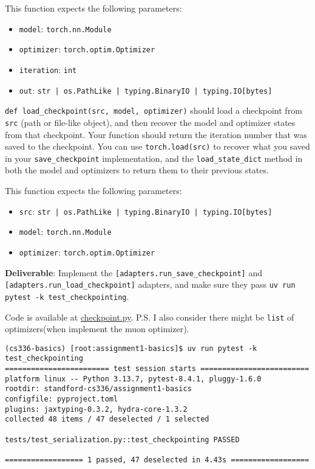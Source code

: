 This function expects the following parameters:
\begin{itemize}
    \item \texttt{model}: \texttt{torch.nn.Module}
    \item \texttt{optimizer}: \texttt{torch.optim.Optimizer}
    \item \texttt{iteration}: \texttt{int}
    \item \texttt{out}: \texttt{str | os.PathLike | typing.BinaryIO | typing.IO[bytes]}
\end{itemize}

\texttt{def load\_checkpoint(src, model, optimizer)} should load a checkpoint from \texttt{src} (path or file-like object), and then recover the model and optimizer states from that checkpoint. Your function should return the iteration number that was saved to the checkpoint. You can use \texttt{torch.load(src)} to recover what you saved in your \texttt{save\_checkpoint} implementation, and the \texttt{load\_state\_dict} method in both the model and optimizers to return them to their previous states.

This function expects the following parameters:
\begin{itemize}
    \item \texttt{src}: \texttt{str | os.PathLike | typing.BinaryIO | typing.IO[bytes]}
    \item \texttt{model}: \texttt{torch.nn.Module}
    \item \texttt{optimizer}: \texttt{torch.optim.Optimizer}
\end{itemize}

\textbf{Deliverable}: Implement the \lstinline{[adapters.run_save_checkpoint]} and \lstinline{[adapters.run_load_checkpoint]} adapters, and make sure they pass \lstinline{uv run pytest -k test_checkpointing}.

\begin{answer}
Code is available at \href{https://github.com/donglinkang2021/assignment1-basics/blob/main/cs336_basics/checkpoint.py}{checkpoint.py}. P.S. I also consider there might be \lstinline{list} of optimizers(when implement the muon optimizer).
\end{answer}

\begin{lstlisting}
(cs336-basics) [root:assignment1-basics]$ uv run pytest -k test_checkpointing
======================== test session starts =========================
platform linux -- Python 3.13.7, pytest-8.4.1, pluggy-1.6.0
rootdir: standford-cs336/assignment1-basics
configfile: pyproject.toml
plugins: jaxtyping-0.3.2, hydra-core-1.3.2
collected 48 items / 47 deselected / 1 selected                      

tests/test_serialization.py::test_checkpointing PASSED

================== 1 passed, 47 deselected in 4.43s ==================
\end{lstlisting}

